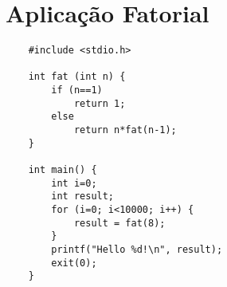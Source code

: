 \chapter{Aplicação Fatorial}
\label{anexo:fatorial}

\begin{scriptsize}
\begin{verbatim}
	#include <stdio.h>
	
	int fat (int n) {
		if (n==1)
			return 1;
		else
			return n*fat(n-1);
	}
	
	int main() {
		int i=0;
		int result;
		for (i=0; i<10000; i++) {
			result = fat(8);
		}
		printf("Hello %d!\n", result);
		exit(0);
	}
\end{verbatim}
\end{scriptsize}